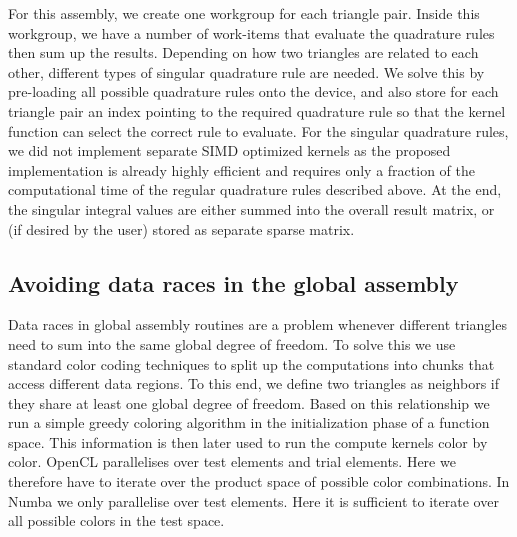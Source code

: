For this assembly, we create one workgroup for each triangle pair. Inside this workgroup, we have a number of work-items that evaluate the quadrature rules then sum up the results. Depending on how two triangles are related to each other, different types of singular quadrature rule are needed. We solve this by pre-loading all possible quadrature rules onto the device, and also store for each triangle pair an index pointing to the required quadrature rule so that the kernel function can select the correct rule to evaluate. For the singular quadrature rules, we did not implement separate SIMD optimized kernels as the proposed implementation is already highly efficient and requires only a fraction of the computational time of the regular quadrature rules described above. At the end, the singular integral values are either summed into the overall result matrix, or (if desired by the user) stored as separate sparse matrix.

\subsection{Avoiding data races in the global assembly}

Data races in global assembly routines are a problem whenever different triangles need to sum into the same global degree of freedom. To solve this we use standard color coding techniques to split up the computations into chunks that access different data regions. To this end, we define two triangles as neighbors if they share at least one global degree of freedom. Based on this relationship we run a simple greedy coloring algorithm in the initialization phase of a function space. This information is then later used to run the compute kernels color by color. OpenCL parallelises over test elements and trial elements. Here we therefore have to iterate over the product space of possible color combinations. In Numba we only parallelise over test elements. Here it is sufficient to iterate over all possible colors in the test space.


